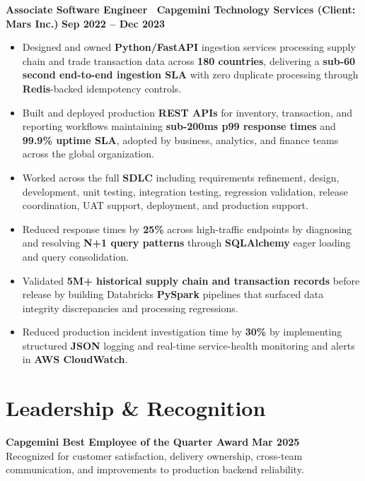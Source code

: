 \documentclass[10pt,letterpaper]{article}
\begin{document}
\textbf{Associate Software Engineer \textbar\
Capgemini Technology Services (Client: Mars Inc.)}
\hfill \textbf{Sep 2022 -- Dec 2023}
\begin{itemize}
  \item Designed and owned \textbf{Python/FastAPI} ingestion services processing
  supply chain and trade transaction data across \textbf{180 countries},
  delivering a \textbf{sub-60 second end-to-end ingestion SLA} with zero
  duplicate processing through \textbf{Redis}-backed idempotency controls.
  \item Built and deployed production \textbf{REST APIs} for inventory,
  transaction, and reporting workflows maintaining \textbf{sub-200ms p99
  response times} and \textbf{99.9\% uptime SLA}, adopted by business,
  analytics, and finance teams across the global organization.
  \item Worked across the full \textbf{SDLC} including requirements refinement,
  design, development, unit testing, integration testing, regression validation,
  release coordination, UAT support, deployment, and production support.
  \item Reduced response times by \textbf{25\%} across high-traffic endpoints
  by diagnosing and resolving \textbf{N+1 query patterns} through
  \textbf{SQLAlchemy} eager loading and query consolidation.
  \item Validated \textbf{5M+ historical supply chain and transaction records}
  before release by building Databricks \textbf{PySpark} pipelines that
  surfaced data integrity discrepancies and processing regressions.
  \item Reduced production incident investigation time by \textbf{30\%}
  by implementing structured \textbf{JSON} logging and real-time
  service-health monitoring and alerts in \textbf{AWS CloudWatch}.
\end{itemize}
\vspace{2pt}

\section*{Leadership \& Recognition}
\textbf{Capgemini Best Employee of the Quarter Award}
\hfill \textbf{Mar 2025}\\
Recognized for customer satisfaction, delivery ownership, cross-team
communication, and improvements to production backend reliability.
\end{document}
